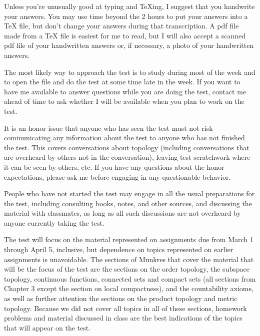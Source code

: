 \documentclass{amsart}
\theoremstyle{plain}
\theoremstyle{definition}
\theoremstyle{remark}
\begin{document}
Unless you're unusually good at typing and TeXing, I suggest that you handwrite your answers. You may use time beyond the 2 hours to put your answers into a TeX file, but don't change your answers during that transcription. A pdf file made from a TeX file is easiest for me to read, but I will also accept a scanned pdf file of your handwritten answers or, if necessary, a photo of your handwritten answers.

The most likely way to approach the test is to study during most of 
the week and to open the file and do the test at some time late in the week.  If you want to have me available to answer questions while you are doing the test, contact me ahead of time to ask whether I will be available when you plan to work on the test. 

It is an honor issue that anyone who has seen the test must not risk 
communicating any information about the test to anyone who has not 
finished the test.  This covers conversations about topology   
(including conversations that are overheard by others not in the 
conversation), leaving test scratchwork where it can be seen by others, etc.  If you have 
any questions about the honor expectations, please ask me before 
engaging in any questionable behavior.  

People who have not started the test may engage in all the usual 
preparations for the test, including consulting books, notes, and 
other sources, and discussing the material with classmates, as long as 
all such discussions are not overheard by anyone currently taking the 
test.

The test will focus on the material represented on assignments due from March 1 through April 5, inclusive, but dependence on topics represented on earlier assignments is unavoidable.  The sections of Munkres that cover the material that will be the focus of the test are the sections on the order topology, the subspace topology, continuous functions, connected sets and compact sets (all sections from Chapter 3 except the section on local compactness), and the countability axioms, as well as further attention the sections on the product topology and metric topology. Because we did not cover all topics in all of these sections, homework problems and material discussed in class are the best indications of the topics that will appear on the test. 




 
\end{document}
